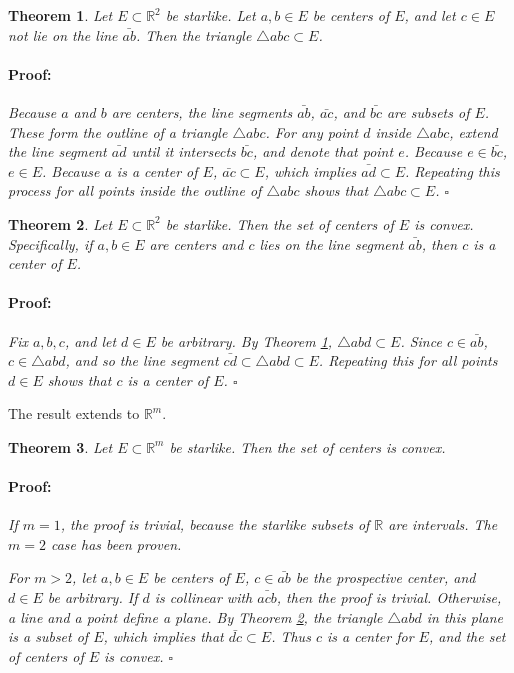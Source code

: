 \documentclass{article}
\newenvironment{proof}{\paragraph{Proof:}}{\hfill$\square$}
\newtheorem{theorem}{Theorem}
\newcommand{\R}{\mathbb{R}}
\begin{document}
\begin{theorem}
\label{TheoremTriangleInE}
Let $E \subset \R^2$ be starlike. Let $a, b \in E$ be centers of $E$, and let $c \in E$ not lie on the line $\bar{ab}$. Then the triangle $\bigtriangleup abc \subset E$.
\begin{proof}
Because $a$ and $b$ are centers, the line segments $\bar{ab}$, $\bar{ac}$, and $\bar{bc}$ are subsets of $E$. These form the outline of a triangle $\bigtriangleup abc$. For any point $d$ inside $\bigtriangleup abc$, extend the line segment $\bar{ad}$ until it intersects $\bar{bc}$, and denote that point $e$. Because $e \in \bar{bc}$, $e \in E$. Because $a$ is a center of $E$, $\bar{ac} \subset E$, which implies $\bar{ad} \subset E$. Repeating this process for all points inside the outline of $\bigtriangleup abc$ shows that $\bigtriangleup abc \subset E$.
\end{proof}
\end{theorem}

\begin{theorem}
\label{TheoremCenterConvexityR2}
Let $E \subset \R^2$ be starlike. Then the set of centers of $E$ is convex. Specifically, if $a, b \in E$ are centers and $c$ lies on the line segment $\bar{ab}$, then $c$ is a center of $E$.
\begin{proof}
Fix $a, b, c$, and let $d \in E$ be arbitrary. By Theorem \ref{TheoremTriangleInE}, $\bigtriangleup abd \subset E$. Since $c \in \bar{ab}$, $c \in \bigtriangleup abd$, and so the line segment $\bar{cd} \subset \bigtriangleup abd \subset E$. Repeating this for all points $d \in E$ shows that $c$ is a center of $E$.
\end{proof}
\end{theorem}

The result extends to $\R^m$.

\begin{theorem}
Let $E \subset \R^m$ be starlike. Then the set of centers is convex.
\begin{proof}
If $m=1$, the proof is trivial, because the starlike subsets of $\R$ are intervals. The $m=2$ case has been proven.

For $m > 2$, let $a, b \in E$ be centers of $E$, $c \in \bar{ab}$ be the prospective center, and $d \in E$ be arbitrary. If $d$ is collinear with $\bar{acb}$, then the proof is trivial. Otherwise, a line and a point define a plane. By Theorem \ref{TheoremCenterConvexityR2}, the triangle $\bigtriangleup abd$ in this plane is a subset of $E$, which implies that $\bar{dc} \subset E$. Thus $c$ is a center for $E$, and the set of centers of $E$ is convex.
\end{proof}
\end{theorem}
\end{document}
